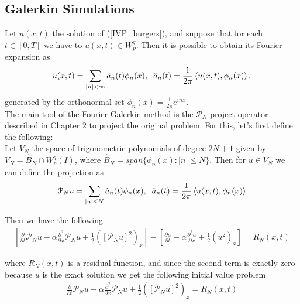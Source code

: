 	\subsection{Galerkin Simulations}
		Let $u(x, t)$ the solution of (\ref{IVP_burgers}), and suppose that for each $t \in [0, T]$ we have to $u(x, t) \in W^q_p$. Then it is possible to obtain its Fourier expansion as
		\begin{align*}
			u(x, t) = \displaystyle \sum_{|n| < \infty} \hat{a}_n (t) \phi_n (x), \hspace{2mm} \hat{a}_n (t) = \frac{1}{2 \pi} \left\langle u (x, t), \phi_n (x) \right\rangle, 
		\end{align*}
		generated by the orthonormal set $\phi_n (x) = \frac{1}{2 \pi} e^{inx}$. \\
		
		The main tool of the Fourier Galerkin method is the $\mathcal{P}_N$ project operator described in Chapter $2$ to project the original problem. For this, let's first define the following: \\
		
		Let $V_N$ the space of trigonometric polynomials of degree $2N + 1$ given by $V_N = \hat{B}_N \cap W^q_p (I)$, where $\hat{B}_N = span\{\phi_n (x) : |n| \leq N\}$. Then for $u \in V_N$ we can define the projection as
		\begin{align*}
			\mathcal{P}_N u = \displaystyle \sum_{|n| \leq N} \hat{a}_n (t) \phi_n (x), \hspace{2mm} \hat{a}_n (t) = \frac{1}{2 \pi} \left\langle u (x, t), \phi_n (x) \right\rangle  
		\end{align*}  
		
		Then we have the following
		\begin{align*}
			\left[ \frac{\partial}{\partial t} \mathcal{P}_N u - \alpha \frac{\partial^2}{\partial x} \mathcal{P}_N u + \frac{1}{2} (\left[ \mathcal{P}_N u \right]^2)_x \right] - \left[ \frac{\partial u}{\partial t} - \alpha \frac{\partial^2 u}{\partial x} + \frac{1}{2} (u^2)_x \right] = R_N (x, t)   
		\end{align*}
		
		where $ R_N (x, t) $ is a residual function, and since the second term is exactly zero because $ u $ is the exact solution we get the following initial value problem
		\begin{align*}
			\frac{\partial}{\partial t} \mathcal{P}_N u -  \alpha \frac{\partial^2}{\partial x} \mathcal{P}_N u + \frac{1}{2} (\left[ \mathcal{P}_N u \right]^2)_x = R_N (x, t)
		\end{align*}
		
